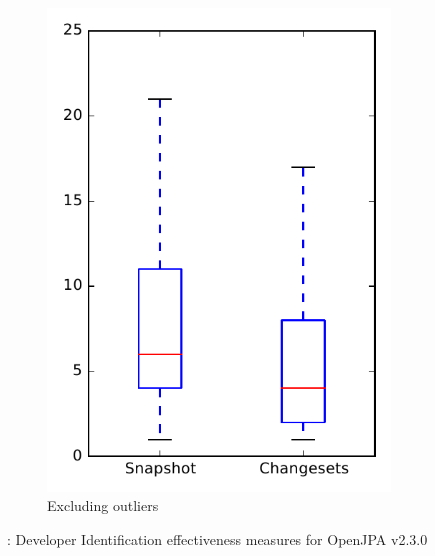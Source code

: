 \begin{figure}
\begin{subfigure}{.4\textwidth}
        \includegraphics[height=0.4\textheight]{figures/dit/rq1_openjpa_no_outlier}
        \caption{Excluding outliers}\label{fig:dit:rq1:openjpa_no_outlier}
    \end{subfigure}
\caption{\done: Developer Identification effectiveness measures for OpenJPA v2.3.0}
\label{fig:dit:rq1:openjpa}
\end{figure}
